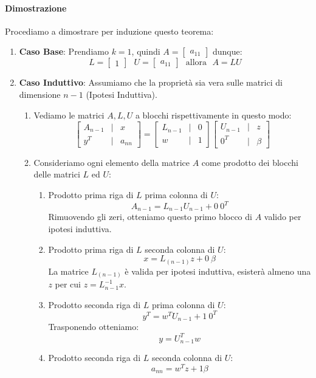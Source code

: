 \documentclass{article}
\begin{document}
\paragraph{Dimostrazione}

Procediamo a dimostrare per induzione questo teorema:

\begin{enumerate}
    \item \textbf{Caso Base}: Prendiamo $k=1$, quindi $A=\begin{bmatrix}
       a_{11}
   \end{bmatrix}$ dunque:
   \[ L=\begin{bmatrix}
       1
   \end{bmatrix} \: \: \:
   U=
   \begin{bmatrix}
       a_{11}
   \end{bmatrix} \:\:\:
   \text{allora}
   \:\:\:
   A=LU\]
   \item \textbf{Caso Induttivo}: Assumiamo che la proprietà sia vera sulle matrici di dimensione $n-1$ (Ipotesi Induttiva).
   \begin{enumerate}
       \item Vediamo le matrici $A, L, U$ a blocchi rispettivamente in questo modo:
       \[ \begin{bmatrix}
           A_{n-1} & | & x\\
           \hline
           y^T & | & a_{nn}
       \end{bmatrix} =
       \begin{bmatrix}
           L_{n-1} & | & 0\\
           \hline
           w & | & 1
       \end{bmatrix}
       \begin{bmatrix}
           U_{n-1} & | & z\\
           \hline
           0^T & | & \beta
       \end{bmatrix}
       \]
       \item Consideriamo ogni elemento della matrice $A$ come prodotto dei blocchi delle matrici $L$ ed $U$:
       \begin{enumerate}
           \item Prodotto prima riga di $L$ prima colonna di $U$:
           \[ A_{n-1} = L_{n-1}U_{n-1} + 0\:0^{T}\]
           Rimuovendo gli zeri, otteniamo questo primo blocco di $A$ valido per ipotesi induttiva.
           \newpage
           \item Prodotto prima riga di $L$ seconda colonna di $U$:
           \[ x = L_{(n-1)}z + 0 \: \beta  \]
           La matrice $L_{(n-1)}$ è valida per ipotesi induttiva, esisterà almeno una $z$ per cui $z=L^{-1}_{n-1}x$.
           \item Prodotto seconda riga di $L$ prima colonna di $U$:
           \[ y^{T} = w^{T}U_{n-1} + 1\:0^{T} \]
           Trasponendo otteniamo:
           \[ y = U^{T}_{n-1}w \]
           \item Prodotto seconda riga di $L$ seconda colonna di $U$:
           \[ a_{nn} = w^{T}z + 1\beta \]
       \end{enumerate}
   \end{enumerate}
\end{enumerate}
\end{document}
